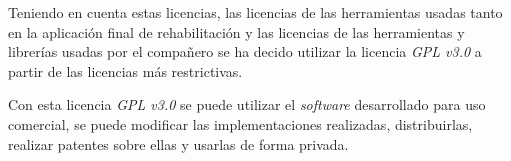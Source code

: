 Teniendo en cuenta estas licencias, las licencias de las herramientas usadas tanto en la aplicación final de rehabilitación y las licencias de las herramientas y librerías usadas por el compañero se ha decido utilizar la licencia \textit{GPL v3.0} a partir de las licencias más restrictivas.

Con esta licencia \textit{GPL v3.0} se puede utilizar el \textit{software} desarrollado para uso comercial, se puede modificar las implementaciones realizadas,  distribuirlas, realizar patentes sobre ellas y usarlas de forma privada.